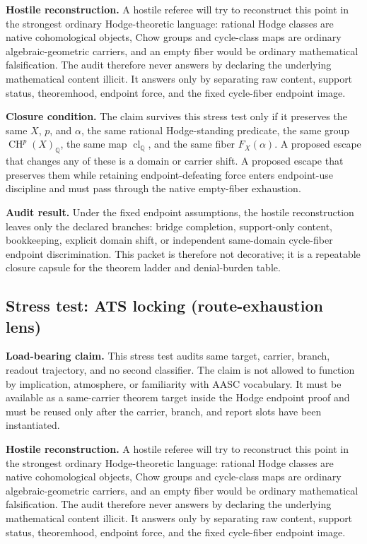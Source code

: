 \documentclass[11pt]{article}
\newcommand{\QQ}{\mathbb{Q}}
\newcommand{\CH}{\operatorname{CH}}
\newcommand{\clQ}{\operatorname{cl}_{\QQ}}
\begin{document}
\par\noindent\textbf{Hostile reconstruction.} A hostile referee will try to reconstruct this point in the strongest ordinary Hodge-theoretic language: rational Hodge classes are native cohomological objects, Chow groups and cycle-class maps are ordinary algebraic-geometric carriers, and an empty fiber would be ordinary mathematical falsification. The audit therefore never answers by declaring the underlying mathematical content illicit. It answers only by separating raw content, support status, theoremhood, endpoint force, and the fixed cycle-fiber endpoint image.

\par\noindent\textbf{Closure condition.} The claim survives this stress test only if it preserves the same $X$, $p$, and $\alpha$, the same rational Hodge-standing predicate, the same group $\CH^p(X)_\QQ$, the same map $\clQ$, and the same fiber $F_X(\alpha)$. A proposed escape that changes any of these is a domain or carrier shift. A proposed escape that preserves them while retaining endpoint-defeating force enters endpoint-use discipline and must pass through the native empty-fiber exhaustion.

\par\noindent\textbf{Audit result.} Under the fixed endpoint assumptions, the hostile reconstruction leaves only the declared branches: bridge completion, support-only content, bookkeeping, explicit domain shift, or independent same-domain cycle-fiber endpoint discrimination. This packet is therefore not decorative; it is a repeatable closure capsule for the theorem ladder and denial-burden table.


\subsection{Stress test: ATS locking (route-exhaustion lens)}

\par\noindent\textbf{Load-bearing claim.} This stress test audits same target, carrier, branch, readout trajectory, and no second classifier. The claim is not allowed to function by implication, atmosphere, or familiarity with AASC vocabulary. It must be available as a same-carrier theorem target inside the Hodge endpoint proof and must be reused only after the carrier, branch, and report slots have been instantiated.

\par\noindent\textbf{Hostile reconstruction.} A hostile referee will try to reconstruct this point in the strongest ordinary Hodge-theoretic language: rational Hodge classes are native cohomological objects, Chow groups and cycle-class maps are ordinary algebraic-geometric carriers, and an empty fiber would be ordinary mathematical falsification. The audit therefore never answers by declaring the underlying mathematical content illicit. It answers only by separating raw content, support status, theoremhood, endpoint force, and the fixed cycle-fiber endpoint image.
\end{document}
